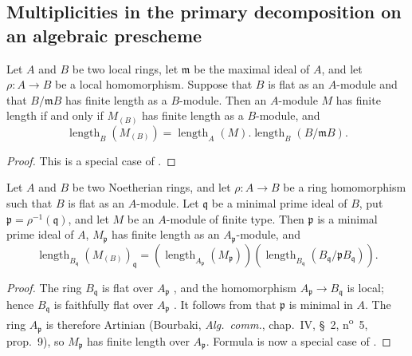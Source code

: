 \subsection{Multiplicities in the primary decomposition on an algebraic prescheme}
\label{subsection:IV.4.7}

\begin{lemma}[4.7.1]
\label{IV.4.7.1}
Let $A$ and $B$ be two local rings, let $\mathfrak m$ be the maximal
ideal of $A$, and let $\rho:A\to B$ be a local homomorphism.
Suppose that $B$ is flat as an $A$-module and that $B/\mathfrak mB$
has finite length as a $B$-module.
Then an $A$-module $M$ has finite length if and only if $M_{(B)}$ has
finite length as a $B$-module, and
\begin{equation}
\operatorname{length}_B(M_{(B)})
=\operatorname{length}_A(M)
 .\operatorname{length}_B(B/\mathfrak mB).
\tag{4.7.1.1}
\label{IV.4.7.1.1}
\end{equation}
\end{lemma}

\begin{proof}
This is a special case of .
\end{proof}

\begin{corollary}[4.7.2]
\label{IV.4.7.2}
Let $A$ and $B$ be two Noetherian rings, and let
$\rho:A\to B$ be a ring homomorphism such that $B$ is flat as an
$A$-module.
Let $\mathfrak q$ be a minimal prime ideal of $B$, put
$\mathfrak p=\rho^{-1}(\mathfrak q)$, and let $M$ be an $A$-module
of finite type.
Then $\mathfrak p$ is a minimal prime ideal of $A$,
$M_{\mathfrak p}$ has finite length as an $A_{\mathfrak p}$-module,
and
\begin{equation}
\operatorname{length}_{B_{\mathfrak q}}
 (M_{(B)})_{\mathfrak q}
=
(\operatorname{length}_{A_{\mathfrak p}}(M_{\mathfrak p}))
(\operatorname{length}_{B_{\mathfrak q}}
 (B_{\mathfrak q}/\mathfrak pB_{\mathfrak q})).
\tag{4.7.2.1}
\label{IV.4.7.2.1}
\end{equation}
\end{corollary}

\begin{proof}
The ring $B_{\mathfrak q}$ is flat over $A_{\mathfrak p}$
, and the homomorphism
$A_{\mathfrak p}\to B_{\mathfrak q}$ is local; hence
$B_{\mathfrak q}$ is faithfully flat over $A_{\mathfrak p}$
.
It follows from  that $\mathfrak p$ is minimal in $A$.
The ring $A_{\mathfrak p}$ is therefore Artinian
(Bourbaki, \emph{Alg.\ comm.}, chap.~IV, \S~2,
n\textsuperscript{o}~5, prop.~9), so $M_{\mathfrak p}$ has finite
length over $A_{\mathfrak p}$.
Formula  is now a special case of
.
\end{proof}

